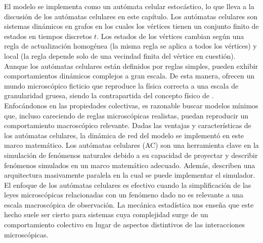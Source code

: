 El modelo se implementa como un autómata celular estocástico, lo que lleva a la discusión de los autómatas celulares en este capítulo. Los autómatas celulares son sistemas dinámicos en grafos en los cuales los vértices tienen un conjunto finito de estados en tiempos discretos $t$. Los estados de los vértices cambian según una regla de actualización homogénea (la misma regla se aplica a todos los vértices) y local (la regla depende solo de una vecindad finita del vértice en cuestión). Aunque los autómatas celulares están definidos por reglas simples, pueden exhibir comportamientos dinámicos complejos a gran escala. De esta manera, ofrecen un mundo microscópico ficticio que reproduce la física correcta a una escala de granularidad gruesa, siendo la contrapartida del concepto físico de . Enfocándonos en las propiedades colectivas, es razonable buscar modelos mínimos que, incluso careciendo de reglas microscópicas realistas, puedan reproducir un comportamiento macroscópico relevante. Dadas las ventajas y características de los autómatas celulares, la dinámica de red del modelo se implementó en este marco matemático. Los autómatas celulares (AC) son una herramienta clave en la simulación de fenómenos naturales debido a su capacidad de proyectar y describir fenómenos simulados en un marco matemático adecuado. Además, describen una arquitectura masivamente paralela en la cual se puede implementar el simulador. El enfoque de los autómatas celulares es efectivo cuando la simplificación de las leyes microscópicas relacionadas con un fenómeno dado no es relevante a una escala macroscópica de observación. La mecánica estadística nos enseña que este hecho suele ser cierto para sistemas cuya complejidad surge de un comportamiento colectivo en lugar de aspectos distintivos de las interacciones microscópicas.



